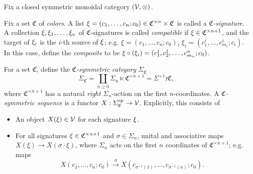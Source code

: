 \documentclass[a4paper,10pt
,draft
]{article}%
\renewcommand{\1}{\eta}%
\begin{document}
Fix a closed symmetric monoidal category $(\mathcal V, \otimes)$.

\begin{definition}
      Fix a set $\mathfrak C$ of \textit{colors}.
      A list
      $\xi = (c_1, \ldots, c_n; c_0) \in \mathfrak C^{\times n} \times \mathfrak C$
      is called a \textit{$\mathfrak C$-signature}.
      A collection $\xi, \xi_1,\dots, \xi_n$ of $\mathfrak C$-signatures is called \textit{compatible} if
      $\xi \in \mathfrak C^{\times n+1}$, and the target of $\xi_i$ is the $i$-th source of $\xi$;
      e.g.  $\xi = (c_1, \ldots, c_n; c_0)$, $\xi_i = (c_{1}^i, \ldots, c_{m_i}^i; c_i)$.
      In this case, define the \textit{composite} to be $\xi \circ (\xi_i) = (c_1^1,c_2^1,\dots,c_{m_n}^{n}; c_0)$.
\end{definition}

\begin{definition}
      For a set $\mathfrak C$, define the \textit{$\mathfrak C$-symmetric category} $\Sigma_{\mathfrak C}$
      \begin{equation}
            \Sigma_{\mathfrak C} = \coprod_{n \geq 0} \Sigma_n \ltimes \mathfrak C^{\times n+1} = \Sigma^{+1} \wr \mathfrak C,
      \end{equation}
      where $\mathfrak C^{\times n+1}$ has a natural \textit{right} $\Sigma_n$-action on the first $n$-coordinates.
      A \textit{$\mathfrak C$-symmetric sequence} is a functor $X: \Sigma_{\mathfrak C}^{op} \to \mathcal V$.
      Explicitly, this consists of
      \begin{itemize} %
      \item An object $X(\xi) \in \mathcal V$ for each signature $\xi$.
      \item For all signatures $\xi \in \mathfrak C^{\times n+1}$ and $\sigma \in \Sigma_n$,
            unital and associative maps $X(\xi) \to X(\sigma \cdot \xi)$,
            where $\Sigma_n$ acts on the first $n$ coordinates of $\mathfrak C^{\times n+1}$;
            e.g. maps
            \begin{equation}
                  X(c_1, \ldots, c_n; c_0) \xrightarrow{\sigma} X(c_{\sigma^{-1}(1)}, \ldots, c_{\sigma^{-1}(n)}; c_0).
            \end{equation}
      \end{itemize}
\end{definition}
\end{document}
